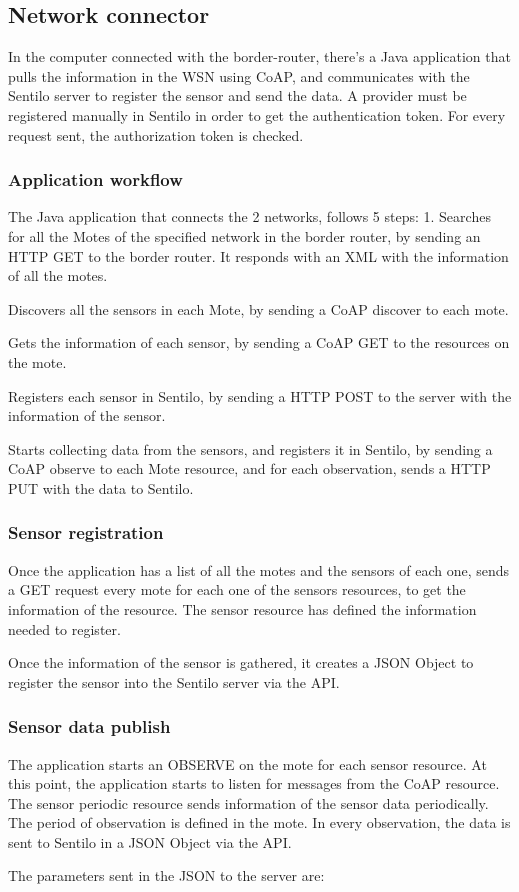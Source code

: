 \subsection{Network connector}
In the computer connected with the border-router,
	there's a Java application that pulls the information in the WSN using CoAP,
	and communicates with the Sentilo server to register the sensor and send the data.
A provider must be registered manually in Sentilo in order to get the authentication token.
For every request sent,
	the authorization token is checked.


\subsubsection{Application workflow}
The Java application that connects the 2 networks,
	follows 5 steps: 1.
Searches for all the Motes of the specified network in the border router,
	by sending an HTTP GET to the border router.
It responds with an XML with the information of all the motes.

Discovers all the sensors in each Mote,
	by sending a CoAP discover to each mote.


Gets the information of each sensor,
	by sending a CoAP GET to the resources on the mote.


Registers each sensor in Sentilo,
	by sending a HTTP POST to the server with the information of the sensor.

Starts collecting data from the sensors,
	and registers it in Sentilo,
	by sending a CoAP observe to each Mote resource,
	and for each observation,
	sends a HTTP PUT with the data to Sentilo.

\subsubsection{Sensor registration}
Once the application has a list of all the motes and the sensors of each one,
	sends a GET request every mote for each one of the sensors resources,
	to get the information of the resource.
The sensor resource has defined the information needed to register.

Once the information of the sensor is gathered,
	it creates a JSON Object to register the sensor into the Sentilo server via the API.

\subsubsection{Sensor data publish}
The application starts an OBSERVE on the mote for each sensor resource.
At this point,
	the application starts to listen for messages from the CoAP resource.
The sensor periodic resource sends information of the sensor data periodically.
The period of observation is defined in the mote.
In every observation,
	the data is sent to Sentilo in a JSON Object via the API.

The parameters sent in the JSON to the server are:













